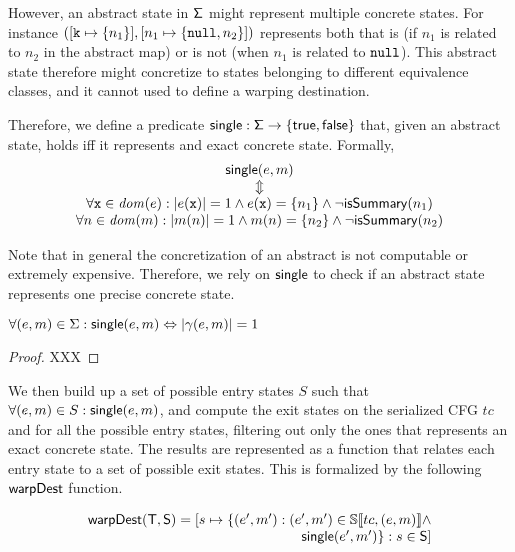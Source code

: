 However, an abstract state in $\mathsf{\Sigma}$ might represent multiple concrete states. For instance $([\mathtt{k} \mapsto \{n_1\}], [n_1 \mapsto \{\mathtt{null}, n_2\}])$ represents both that   is (if $n_1$ is related to $n_2$ in the abstract map) or is not (when $n_1$ is related to $\mathtt{null}$). This abstract state therefore might concretize to states belonging to different equivalence classes, and it cannot used to define a warping destination.

Therefore, we define a predicate $\mathsf{single} : \mathsf{\Sigma} \to \{\mathsf{true}, \mathsf{false}\}$ that, given an abstract state, holds iff it represents and exact concrete state. Formally,
\[
\begin{array}{c}
\mathsf{single}(e, m)\\
\Updownarrow\\
\forall \mathtt{x} \in \mathit{dom}(e) : |e(\mathtt{x})|=1 \land e(\mathtt{x})=\{n_1\} \land \neg \mathsf{isSummary}(n_1)\\
\forall n \in \mathit{dom}(m) : |m(n)|=1 \land m(n)=\{n_2\} \land \neg \mathsf{isSummary}(n_2)\\
\end{array}
\]

Note that in general the concretization of an abstract is not computable or extremely expensive. Therefore, we rely on $\mathsf{single}$ to check if an abstract state represents one precise concrete state.

\begin{lemma}
	$\forall (e, m) \in \Sigma : \mathsf{single}(e, m) \Leftrightarrow |\gamma(e, m)|=1$
	\begin{proof}
		XXX
	\end{proof}
\end{lemma}


We then build up a set of possible entry states $S$ such that $\forall (e, m) \in S : \mathsf{single}(e, m)$, and compute the exit states on the serialized CFG $tc$ and for all the possible entry states, filtering out only the ones that represents an exact concrete state. The results are represented as a function that relates each entry state to a set of possible exit states. This is formalized by the following $\mathsf{warpDest}$ function.


\[
\begin{array}{r}
\mathsf{warpDest}(\mathsf{T}, \mathsf{S}) =[s \mapsto \{ (e', m'): (e', m') \in \mathbb{S}\llbracket tc, (e, m) \rrbracket \land\\
\mathsf{single}(e', m')\} : s \in \mathsf{S}]\\
\end{array}
\]

